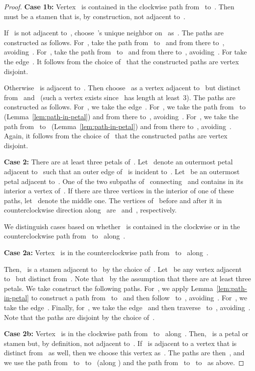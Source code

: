 \documentclass{llncs}
\begin{document}
\begin{proof}
  \textbf{Case 1b:} Vertex~ is contained in the clockwise path
  from~ to~.  Then~ must be a stamen that is, by
  construction, not adjacent to~.

  If~ is not adjacent to~, choose~'s unique neighbor on~
  as~.  The paths are constructed as follows.  For~, take the
  path from~ to~ and from there to~, avoiding~.  For~,
  take the path from~ to~ and from there to~, avoiding~.
  For  take the edge~.  It follows from the choice of~ that
  the constructed paths are vertex disjoint.

  Otherwise~ is adjacent to~.  Then choose~ as a vertex
  adjacent to~ but distinct from~ and~ (such a vertex exists
  since~ has length at least~3).  The paths are constructed as
  follows.  For~, we take the edge~.  For~, we take the path
  from~ to~ (Lemma~\ref{lem:path-in-petal}) and from there
  to~, avoiding~.  For~, we take the path from~ to~
  (Lemma~\ref{lem:path-in-petal}) and from there to~, avoiding~.
  Again, it follows from the choice of~ that the constructed paths
  are vertex disjoint.

  \textbf{Case 2:} There are at least three petals of~.  Let~
  denote an outermost petal adjacent to~ such that an outer edge
  of~ is incident to~.  Let~ be an outermost petal
  adjacent to~.  One of the two subpaths of~
  connecting~ and  contains in its interior a vertex of~.  If
  there are three vertices in the interior of one of these paths,
  let~ denote the middle one.  The vertices of~ before and after
  it in counterclockwise direction along~ are~ and~,
  respectively.

  We distinguish cases based on whether~ is contained in the
  clockwise or in the counterclockwise path from~ to~
  along~.

  \textbf{Case 2a:} Vertex~ is in the counterclockwise path
  from~ to~ along~.

  Then,~ is a stamen adjacent to~ by the choice of~.  Let~
  be any vertex adjacent to~ but distinct from~.  Note that~ by the assumption that there are at least three petals.  We
  take construct the following paths.  For~, we apply
  Lemma~\ref{lem:path-in-petal} to construct a path from~ to~
  and then follow~ to~, avoiding~.  For~, we take
  the edge~.  Finally, for~, we take the edge~ and then
  traverse~ to~, avoiding~.  Note that the paths are
  disjoint by the choice of~.

  \textbf{Case 2b:} Vertex~ is in the clockwise path from~
  to~ along~.  Then,~ is a petal or stamen but, by
  definition, not adjacent to~.  If~ is adjacent to a vertex
  that is distinct from~ as well, then we choose this vertex
  as~.  The paths are then~, and we use the path from~
  to~ to~ (along ) and the path from~ to~
  to~ as above.


\end{proof}
\end{document}
